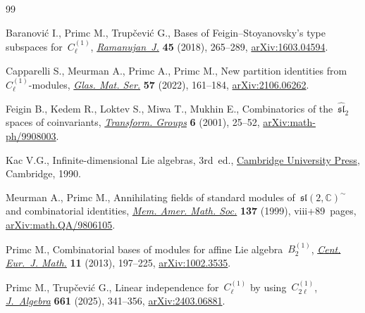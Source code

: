 \begin{thebibliography}{99}
\footnotesize\itemsep=0pt

Baranovi\'c I., Primc M., Trup\v{c}evi\'c G., Bases of
  {F}eigin--{S}toyanovsky's type subspaces for~{$C_\ell^{(1)}$},
  \href{https://doi.org/10.1007/s11139-016-9840-y}{\textit{Ramanujan~J.}}
  \textbf{45} (2018), 265--289,
  \href{http://arxiv.org/abs/1603.04594}{arXiv:1603.04594}.

Capparelli S., Meurman A., Primc A., Primc M., New partition identities
  from~{$C^{(1)}_\ell$}-modules,
  \href{https://doi.org/10.3336/gm.57.2.01}{\textit{Glas. Mat. Ser.}}
  \textbf{57} (2022), 161--184,
  \href{http://arxiv.org/abs/2106.06262}{arXiv:2106.06262}.

Feigin B., Kedem R., Loktev S., Miwa T., Mukhin E., Combinatorics of
  the~{$\widehat{\mathfrak{sl}}_2$} spaces of coinvariants,
  \href{https://doi.org/10.1007/BF01236061}{\textit{Transform. Groups}}
  \textbf{6} (2001), 25--52,
  \href{http://arxiv.org/abs/math-ph/9908003}{arXiv:math-ph/9908003}.

Kac V.G., Infinite-dimensional {L}ie algebras, 3rd~ed.,
  \href{https://doi.org/10.1017/CBO9780511626234}{Cambridge University Press}, Cambridge, 1990.

Meurman A., Primc M., Annihilating fields of standard modules
  of~{$\mathfrak{sl}(2,\mathbb{C})^\sim$} and combinatorial identities,
  \href{https://doi.org/10.1090/memo/0652}{\textit{Mem. Amer. Math. Soc.}}
  \textbf{137} (1999), viii+89~pages,
  \href{http://arxiv.org/abs/math.QA/9806105}{arXiv:math.QA/9806105}.

Primc M., Combinatorial bases of modules for affine {L}ie
  algebra~{$B_2^{(1)}$},
  \href{https://doi.org/10.2478/s11533-012-0111-x}{\textit{Cent. Eur.~J.
  Math.}} \textbf{11} (2013), 197--225,
  \href{http://arxiv.org/abs/1002.3535}{arXiv:1002.3535}.

Primc M., Trup\v{c}evi\'c G., Linear independence for~{$C_\ell^{(1)}$} by
  using~{$C_{2\ell}^{(1)}$},
  \href{https://doi.org/10.1016/j.jalgebra.2024.08.003}{\textit{J.~Algebra}}
  \textbf{661} (2025), 341--356,
  \href{http://arxiv.org/abs/2403.06881}{arXiv:2403.06881}.

\end{thebibliography}
